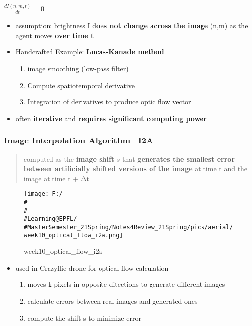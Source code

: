 \documentclass[]{article}
\begin{document}
\(\frac{d I(n, m, t)}{d t}=0\)

\begin{itemize}
\item
  assumption: brightness I d\textbf{oes not change across the image}
  (n,m) as the agent moves \textbf{over time t}
\item
  Handcrafted Example: \textbf{Lucas-Kanade method}

  \begin{enumerate}
  \def\labelenumi{\arabic{enumi}.}
  \item
    image smoothing (low-pass filter)
  \item
    Compute spatiotemporal derivative
  \item
    Integration of derivatives to produce optic flow vector
  \end{enumerate}
\item
  often \textbf{iterative} and \textbf{requires significant computing
  power}
\end{itemize}

\subsubsection{Image Interpolation Algorithm --I2A}\label{header-n2431}

\begin{quote}
computed as the \textbf{image shift} \(s\) that \textbf{generates the
smallest error between artificially shifted versions of the image} at
time t and the image at time t + Δt
\end{quote}

\begin{figure}
\centering
\texttt{[image: F:/\\\#\\\#\\\#Learning@EPFL/\\\#MasterSemester\_21Spring/Notes4Review\_21Spring/pics/aerial/week10\_optical\_flow\_i2a.png]}
\caption{week10\_optical\_flow\_i2a}
\end{figure}

\begin{itemize}
\item
  used in Crazyflie drone for optical flow calculation

  \begin{enumerate}
  \def\labelenumi{\arabic{enumi}.}
  \item
    moves k pixels in opposite ditections to generate different images
  \item
    calculate errors between real images and generated ones
  \item
    compute the shift s to minimize error
  \end{enumerate}
\end{itemize}
\end{document}
